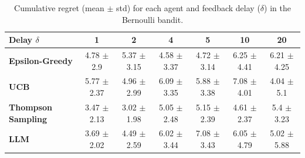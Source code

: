 \begin{table}[htbp]
\caption{Cumulative regret (mean $\pm$ std) for each agent and feedback delay ($\delta$) in the Bernoulli bandit.}
\label{tab:bernoulli_delays}
\begin{tabular}{lcccccc}
\toprule
Delay $\delta$ & 1 & 2 & 4 & 5 & 10 & 20 \\
\midrule
\textbf{Epsilon-Greedy} & 4.78 $\pm$ 2.9 & 5.37 $\pm$ 3.15 & 4.58 $\pm$ 3.37 & 4.72 $\pm$ 3.14 & 6.25 $\pm$ 4.41 & 6.21 $\pm$ 4.25 \\
\textbf{UCB} & 5.77 $\pm$ 2.37 & 4.96 $\pm$ 2.99 & 6.09 $\pm$ 3.35 & 5.88 $\pm$ 3.38 & 7.08 $\pm$ 4.01 & 4.04 $\pm$ 5.1 \\
\textbf{Thompson Sampling} & 3.47 $\pm$ 2.13 & 3.02 $\pm$ 1.98 & 5.05 $\pm$ 2.48 & 5.15 $\pm$ 2.39 & 4.61 $\pm$ 2.37 & 5.4 $\pm$ 3.23 \\
\textbf{LLM} & 3.69 $\pm$ 2.02 & 4.49 $\pm$ 2.59 & 6.02 $\pm$ 3.44 & 7.08 $\pm$ 3.43 & 6.05 $\pm$ 4.79 & 5.02 $\pm$ 5.88 \\
\bottomrule
\end{tabular}
\end{table}
